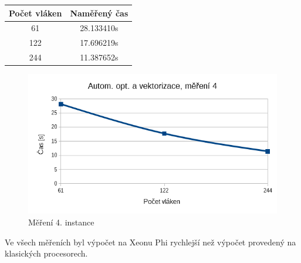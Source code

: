\documentclass[12pt]{article}
\begin{document}
%
%
\begin{center}
\begin{tabular}{ c | c }
\textbf{Počet vláken} & \textbf{Naměřený čas} \\ \hline \hline 
61 & 28.133410s \\ \hline
122 & 17.696219s \\ \hline
244 & 11.387652s \\ \hline
\end{tabular}
\end{center}

\begin{figure}[H]
  \begin{center}
      \includegraphics[width=12cm]{images/phi4.png}	
    \caption{Měření 4. instance} 
  \end{center}
\end{figure}

Ve všech měřeních byl výpočet na Xeonu Phi rychlejší než výpočet provedený na klasických procesorech.
\end{document}
